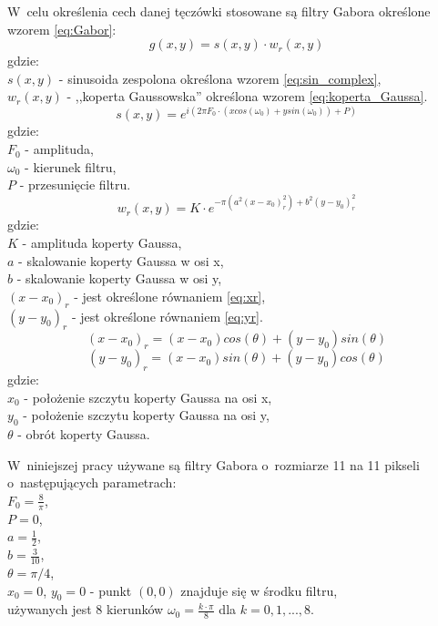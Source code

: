 W~celu określenia cech danej tęczówki stosowane są filtry Gabora określone wzorem \ref{eq:Gabor}:
\begin{equation}
\label{eq:Gabor}
g(x,y) = s(x,y)\cdot w_{r}(x,y)
\end{equation}
gdzie:\\
$s(x,y)$ - sinusoida zespolona określona wzorem \ref{eq:sin_complex},\\
$w_{r}(x,y)$ - ,,koperta Gaussowska'' określona wzorem \ref{eq:koperta_Gaussa}.\\
\begin{equation}
\label{eq:sin_complex}
s(x,y) = e^{i(2 \pi F_{0} \cdot (xcos(\omega_{0}) + ysin(\omega_{0})) + P)}
\end{equation}
gdzie:\\
$F_{0}$ - amplituda,\\
$\omega_{0}$ - kierunek filtru,\\
$P$ - przesunięcie filtru.\\
\begin{equation}
\label{eq:koperta_Gaussa}
w_{r}(x,y) = K \cdot e^{-\pi(a^{2}(x-x_{0})_{r}^{2}) + b^{2}(y-y_{0})_{r}^{2}}
\end{equation}
gdzie:\\
$K$ - amplituda koperty Gaussa,\\
$a$ - skalowanie koperty Gaussa w osi x,\\
$b$ - skalowanie koperty Gaussa w osi y,\\
$(x-x_{0})_{r}$ - jest określone równaniem \ref{eq:xr},\\
$(y-y_{0})_{r}$ - jest określone równaniem \ref{eq:yr}.\\
\begin{equation}
\label{eq:xr}
(x-x_{0})_{r} = (x-x_{0})cos(\theta)+(y-y_{0})sin(\theta)
\end{equation}
\begin{equation}
\label{eq:yr}
(y-y_{0})_{r} = (x-x_{0})sin(\theta)+(y-y_{0})cos(\theta)
\end{equation}
gdzie:\\
$x_{0}$ - położenie szczytu koperty Gaussa na osi x,\\
$y_{0}$ - położenie szczytu koperty Gaussa na osi y,\\
$\theta$ - obrót koperty Gaussa.

W~niniejszej pracy używane są filtry Gabora o~rozmiarze 11 na 11 pikseli o~następujących parametrach:\\
$F_{0} = \frac{8}{\pi}$,\\
$P = 0$,\\
$a = \frac{1}{2}$,\\
$b = \frac{3}{10}$,\\
$\theta = \pi / 4$,\\
$x_{0} = 0$, $y_{0} = 0$ - punkt $(0,0)$ znajduje się w środku filtru,\\
używanych jest 8 kierunków $\omega_{0} =\frac {k \cdot \pi} {8} $ dla $k = 0, 1, ..., 8$.

